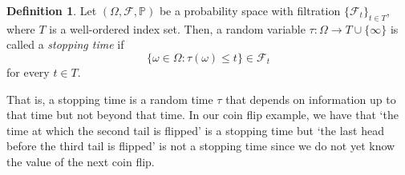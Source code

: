 \documentclass[a4paper,11pt]{article}
\theoremstyle{plain}
\theoremstyle{definition}
\newtheorem{definition}[theorem]{Definition}
\begin{document}

\begin{definition} \citep[p.~40]{M&P}
Let $(\Omega,\mathcal{F},\mathbb{P})$ be a probability space with filtration $\{\mathcal{F}_t\}_{t \in T}$, where $T$ is a well-ordered index set. Then, a random variable $\tau:\Omega \rightarrow T \cup \{\infty\}$ is called a \textit{stopping time} if
\[
\{\omega \in \Omega: \tau(\omega) \leq t\} \in \mathcal{F}_t
\]
for every $t \in T$.
\end{definition}

That is, a stopping time is a random time $\tau$ that depends on information up to that time but not beyond that time. In our coin flip example, we have that `the time at which the second tail is flipped' is a stopping time but `the last head before the third tail is flipped' is not a stopping time since we do not yet know the value of the next coin flip.

\end{document}
